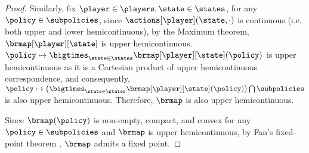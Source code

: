 \begin{proof}
     Similarly, fix $\player \in \players, \state \in \states$, for any $\policy\in \subpolicies$, since $\actions[\player] (\state, \cdot)$ is continuous (i.e. both upper and lower hemicontinuous), by the Maximum theorem, $\brmap[\player][\state]$ is upper hemicontinuous. 
    $\policy\mapsto \bigtimes_{\state \in \states} \brmap[\player][\state] (\policy)$ is upper hemicontinuous as it is a Cartesian product of upper hemicontinuous correspondence, and consequently, $\policy\mapsto \left(\bigtimes_{\state \in \states} \brmap[\player][\state] (\policy) \right) \bigcap \subpolicies$ is also upper hemicontinuous. 
    Therefore, $\brmap$ is also upper hemicontinuous. 

    
    
    
    
    Since $\brmap(\policy)$ is non-empty, compact, and convex for any $\policy\in \subpolicies$ and $\brmap$ is upper hemicontinuous, by Fan's fixed-point theorem \cite{Fan1952FixedPoint}, $\brmap$ admits a fixed point. 


\end{proof}

